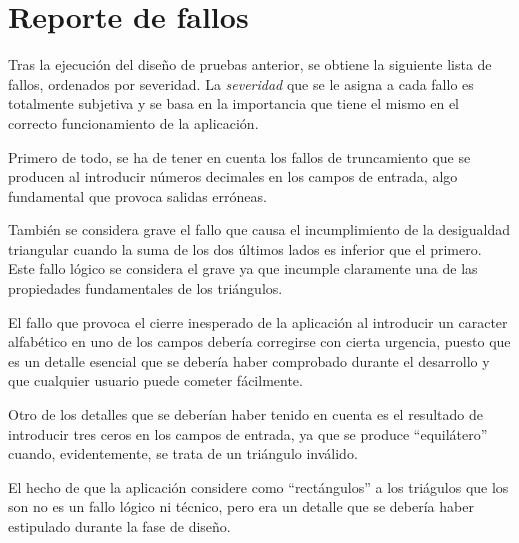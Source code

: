 \chapter{Reporte de fallos}
Tras la ejecución del diseño de pruebas anterior, se obtiene la siguiente lista
de fallos, ordenados por severidad. La \textit{severidad} que se le asigna a
cada fallo es totalmente subjetiva y se basa en la importancia que tiene el
mismo en el correcto funcionamiento de la aplicación.

Primero de todo, se ha de tener en cuenta los fallos de truncamiento que se producen
al introducir números decimales en los campos de entrada, algo fundamental que
provoca salidas erróneas.

También se considera grave el fallo que causa el incumplimiento de la desigualdad
triangular cuando la suma de los dos últimos lados es inferior que el primero.
Este fallo lógico se considera el grave ya que incumple claramente una de las
propiedades fundamentales de los triángulos.

El fallo que provoca el cierre inesperado de la aplicación al introducir un
caracter alfabético en uno de los campos debería corregirse con cierta urgencia,
puesto que es un detalle esencial que se debería haber comprobado durante el
desarrollo y que cualquier usuario puede cometer fácilmente.

Otro de los detalles que se deberían haber tenido en cuenta es el resultado de
introducir tres ceros en los campos de entrada, ya que se produce ``equilátero''
cuando, evidentemente, se trata de un triángulo inválido.

El hecho de que la aplicación considere como ``rectángulos'' a los triágulos que
los son no es un fallo lógico ni técnico, pero era un detalle que se debería haber
estipulado durante la fase de diseño.

